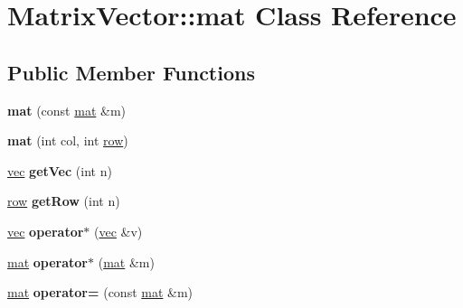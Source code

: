 \hypertarget{class_matrix_vector_1_1mat}{}\section{Matrix\+Vector\+:\+:mat Class Reference}
\label{class_matrix_vector_1_1mat}
\subsection*{Public Member Functions}
\begin{DoxyCompactItemize}
\item 
\mbox{\label{class_matrix_vector_1_1mat_ac6734773d8d3b42b1f2599592fadb8f1}} 
{\bfseries mat} (const \mbox{\hyperlink{class_matrix_vector_1_1mat}{mat}} \&m)
\item 
\mbox{\label{class_matrix_vector_1_1mat_ae97f3cb1740056f1aaacde6038c37200}} 
{\bfseries mat} (int col, int \mbox{\hyperlink{class_matrix_vector_1_1row}{row}})
\item 
\mbox{\label{class_matrix_vector_1_1mat_af971b3b347cdb13e134824d386d2b605}} 
\mbox{\hyperlink{class_matrix_vector_1_1vec}{vec}} {\bfseries get\+Vec} (int n)
\item 
\mbox{\label{class_matrix_vector_1_1mat_acada5c913176b8fa304a4a9d13f8ce3d}} 
\mbox{\hyperlink{class_matrix_vector_1_1row}{row}} {\bfseries get\+Row} (int n)
\item 
\mbox{\label{class_matrix_vector_1_1mat_a1539eaf746ccc04ddd9fb44c08c6aecd}} 
\mbox{\hyperlink{class_matrix_vector_1_1vec}{vec}} {\bfseries operator$\ast$} (\mbox{\hyperlink{class_matrix_vector_1_1vec}{vec}} \&v)
\item 
\mbox{\label{class_matrix_vector_1_1mat_adca8a2d2d0c73d5e35d602b0c0ca858f}} 
\mbox{\hyperlink{class_matrix_vector_1_1mat}{mat}} {\bfseries operator$\ast$} (\mbox{\hyperlink{class_matrix_vector_1_1mat}{mat}} \&m)
\item 
\mbox{\label{class_matrix_vector_1_1mat_a57c3d94280727f931cefd9ce26c54ec7}} 
\mbox{\hyperlink{class_matrix_vector_1_1mat}{mat}} {\bfseries operator=} (const \mbox{\hyperlink{class_matrix_vector_1_1mat}{mat}} \&m)

\end{DoxyCompactItemize}
